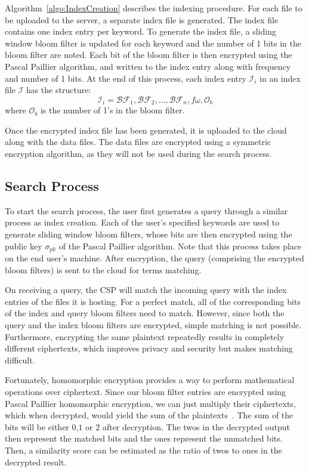 Algorithm~\ref{algo:IndexCreation} describes the indexing procedure.
For each file to be uploaded to the server, a separate index file is generated. The index
file contains one index entry per keyword. To generate the index file, a sliding window bloom
filter is updated for each keyword and the number of 1 bits in the bloom filter are noted.
Each bit of the bloom filter is then encrypted using the Pascal Paillier algorithm, and written to 
the index entry along with frequency and number of 1 bits.
At the end of this process, each index entry $\mathcal{I}_i$ in an index file $\mathcal{I}$ has
the structure: 
\begin{equation}
\mathcal{I}_i = \mathcal{BF}_1,\mathcal{BF}_2, \ldots ,\mathcal{BF}_n, f\omega,
\mathcal{O}_b
  \label{eq: indexEntry}
\end{equation} 
where $\mathcal{O}_b$ is the number of 1's in the bloom filter.

Once the encrypted index file has been generated, it is uploaded to the cloud along with the data files.
The data files are encrypted using a symmetric encryption algorithm, as they will not be used during the
search process.

\subsection{Search Process}

To start the search process, the user first generates a query through a similar process as index creation. 
Each of the user's specified keywords are used to generate sliding window bloom filters, whose bits are then
encrypted using the public key $\sigma_{pk}$ of the Pascal Paillier algorithm. 
Note that this process takes place on the end user's machine. After encryption, 
the query (comprising the encrypted bloom filters) is sent to the cloud for terms matching.

On receiving a query, the CSP will match the incoming query with the index entries of 
the files it is hosting. For a perfect match, all of the corresponding bits of the index 
and query bloom filters need to match. However, since both the query and the index
bloom filters are encrypted, simple matching is not possible. Furthermore, encrypting the
same plaintext repeatedly results in completely different ciphertexts, which improves
privacy and security but makes matching difficult.

Fortunately, homomorphic encryption provides a way to perform mathematical operations 
over ciphertext. Since our bloom filter entries are encrypted using Pascal Paillier homomorphic
encryption, we can just multiply their ciphertexts, which when decrypted, would yield the sum of
the plaintexts~\cite{pascal}. The sum of the bits will be either $0$,$1$ or $2$ after decryption.
The twos in the decrypted output then represent the matched
bits and the ones represent the unmatched bits. Then, a similarity score
can be estimated as the ratio of twos to ones in the decrypted result.

